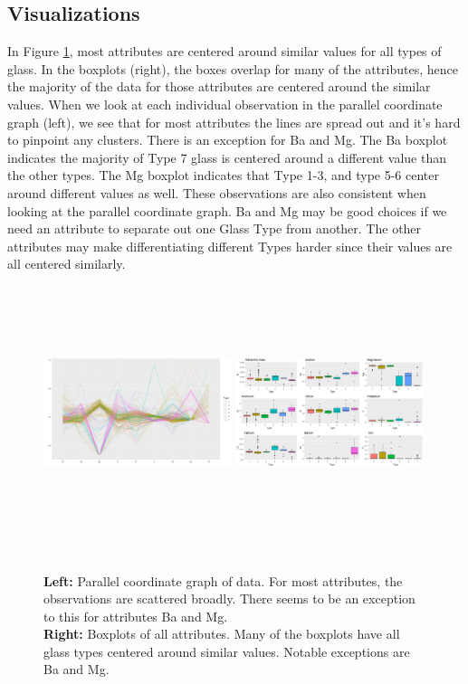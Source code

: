 \documentclass[12pt]{article}
\begin{document}
\subsection{Visualizations}
In Figure \ref{f:dataBasic_Vis}, most attributes are centered around similar values for all types of glass. In the boxplots (right), the boxes overlap for many of the attributes, hence the majority of the data for those attributes are centered around the similar values. When we look at each individual observation in the parallel coordinate graph (left), we see that for most attributes the lines are spread out and it's hard to pinpoint any clusters. There is an exception for Ba and Mg. The Ba boxplot indicates the majority of Type 7 glass is centered around a different value than the other types. The Mg boxplot indicates that Type 1-3, and type 5-6 center around different values as well. These observations are also consistent when looking at the parallel coordinate graph. Ba and Mg may be good choices if we need an attribute to separate out one Glass Type from another. The other attributes may make differentiating different Types harder since their values are all centered similarly. 

\begin{figure}[H]
	\includegraphics[width=0.49\textwidth, height=2.9in]{parccord.png}
	\includegraphics[width=0.49\textwidth, height=2.9in]{boxplot.png}
	\caption{ \\
	\textbf{Left:} Parallel coordinate graph of data. For most attributes, the observations are scattered broadly. There seems to be an exception to this for attributes Ba and Mg.	\\
	\textbf{Right:} Boxplots of all attributes. Many of the boxplots have all glass types centered around similar values. Notable exceptions are Ba and Mg. 
	}
	\label{f:dataBasic_Vis}
\end{figure}
\end{document}
